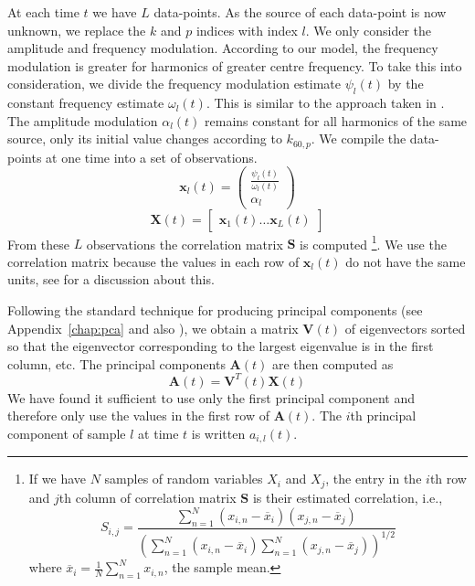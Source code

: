 At each time $t$ we have $L$ data-points. As the source of each data-point is
now unknown, we replace the $k$ and $p$ indices with index $l$. We only consider
the amplitude and frequency modulation. According to our model, the frequency
modulation is greater for harmonics of greater centre frequency. To take this
into consideration, we divide the frequency modulation estimate $\psi_{l}(t)$ by
the constant frequency estimate $\omega_{l}(t)$. This is similar to the approach
taken in \cite{creager2016musicalsource}. The amplitude modulation $\alpha_{l}(t)$
remains constant for all harmonics of the same source, only its initial value
changes according to $k_{60,p}$.  We compile the data-points at one time into a
set of observations.
\begin{equation}
    \mathbf{x}_{l}(t) = \begin{pmatrix}
        \frac{\psi_{l}(t)}{\omega_{l}(t)} \\
        \alpha_{l}
    \end{pmatrix}
\end{equation}
\begin{equation}
    \mathbf{X}(t) = \begin{bmatrix}
        \mathbf{x}_{1}(t) \ldots \mathbf{x}_{L}(t)
    \end{bmatrix}
\end{equation}
From these $L$ observations the correlation matrix $\mathbf{S}$ is
computed%
\footnote{If we have $N$ samples of random variables $X_{i}$ and $X_{j}$, the
    entry in the $i$th row and $j$th column of correlation matrix $\boldsymbol{S}$ is their
    estimated correlation, i.e.,
    \[
        S_{i,j}=\frac{\sum_{n=1}^{N}(x_{i,n}-\overline{x}_{i})(x_{j,n}-\overline{x}_{j})}
        {(\sum_{n=1}^{N}(x_{i,n}-\overline{x}_{i})\sum_{n=1}^{N}(x_{j,n}-\overline{x}_{j}))^{1/2}}
    \]
    where $\overline{x}_{i}=\frac{1}{N}\sum_{n=1}^{N}x_{i,n}$, the sample mean.
}. We
use the correlation matrix because the values in each row of $\mathbf{x}_{l}(t)$
do not have the same units, see \cite[p.~22]{jolliffe2002principal} for a
discussion about this. 

Following the standard technique for producing principal components (see
Appendix~\ref{chap:pca} and also \cite[p.~11]{jolliffe2002principal}), we obtain
a matrix $\mathbf{V}(t)$ of eigenvectors sorted so that the eigenvector
corresponding to the largest eigenvalue is in the first column, etc.  The
principal components $\mathbf{A}(t)$ are then computed as
\begin{equation}
    \mathbf{A}(t) = \mathbf{V}^{T}(t)\mathbf{X}(t)
\end{equation}
We have found it sufficient to use only the first principal component and
therefore only use the values in the first row of $\mathbf{A}(t)$. The $i$th
principal component of sample $l$ at time $t$ is written $a_{i,l}(t)$.

